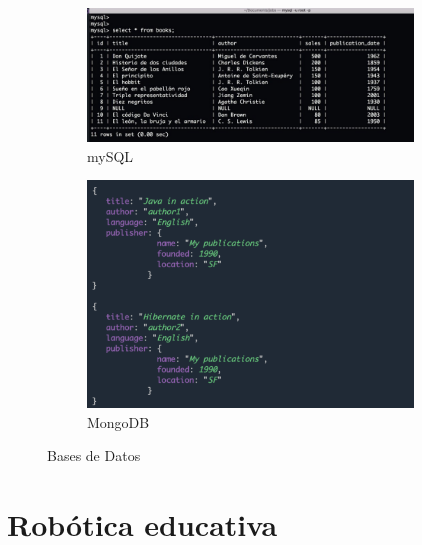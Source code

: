 \begin{figure}[H]
  \begin{subfigure}[b]{0.5\textwidth}
  \centering
    \includegraphics[width=0.95\textwidth, height=0.65\textwidth]{chapters/images/mysql.png}
    \caption{mySQL}
    \label{fig:f1}
  \end{subfigure}
  \hfill
  \begin{subfigure}[b]{0.5\textwidth}
  \centering
    \includegraphics[width=0.95\textwidth, height=0.65\textwidth]{chapters/images/mongodb.png}
    \caption{MongoDB}
    \label{fig:f2}
  \end{subfigure}
  \caption{Bases de Datos}
\end{figure}



\newpage
\section{Robótica educativa}

